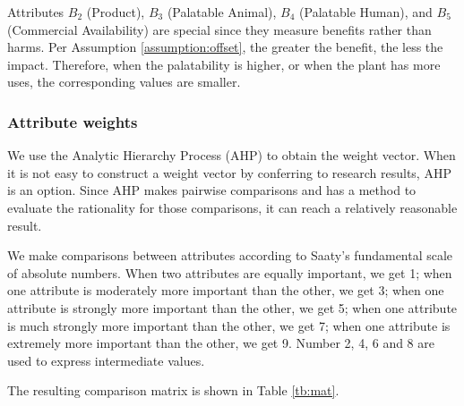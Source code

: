\documentclass[12pt]{article}
\begin{document}
		Attributes $B_2$ (Product), $B_3$ (Palatable Animal), $B_4$ (Palatable Human), and $B_5$ (Commercial Availability) are special since they measure benefits rather than harms.  Per Assumption \ref{assumption:offset}, the greater the benefit, the less the impact.  Therefore, when the palatability is higher, or when the plant has more uses, the corresponding values are smaller.
		
		\subsubsection{Attribute weights}
		\label{sec:attr_weight}
		
		We use the Analytic Hierarchy Process (AHP) to obtain the weight vector.  When it is not easy to construct a weight vector by conferring to research results, AHP is an option.  Since AHP makes pairwise comparisons and has a method to evaluate the rationality for those comparisons, it can reach a relatively reasonable result.
		
		We make comparisons between attributes according to Saaty's fundamental scale of absolute numbers\autocite{AHP}.  When two attributes are equally important, we get 1; when one attribute is moderately more important than the other, we get 3; when one attribute is strongly more important than the other, we get 5; when one attribute is much strongly more important than the other, we get 7; when one attribute is extremely more important than the other, we get 9.  Number 2, 4, 6 and 8 are used to express intermediate values.  
		
		The resulting comparison matrix is shown in Table \ref{tb:mat}.
		
\end{document}
